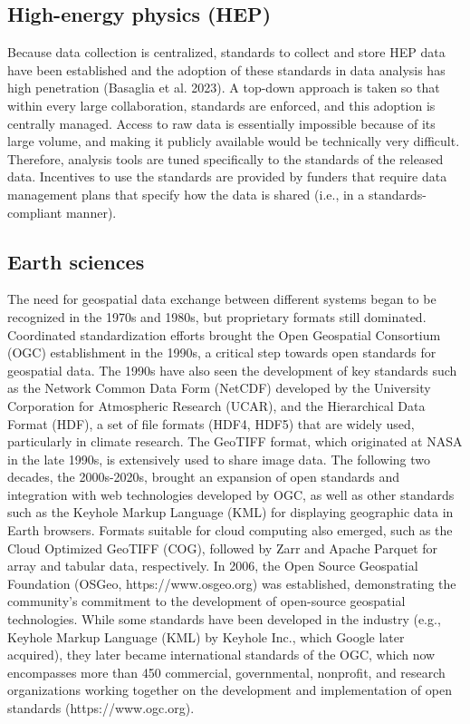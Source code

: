 \documentclass[
  letterpaper,
  DIV=11,
  numbers=noendperiod]{scrartcl}
\begin{document}
\subsection{High-energy physics (HEP)}\label{high-energy-physics-hep}

Because data collection is centralized, standards to collect and store
HEP data have been established and the adoption of these standards in
data analysis has high penetration (Basaglia et al. 2023). A top-down
approach is taken so that within every large collaboration, standards
are enforced, and this adoption is centrally managed. Access to raw data
is essentially impossible because of its large volume, and making it
publicly available would be technically very difficult. Therefore,
analysis tools are tuned specifically to the standards of the released
data. Incentives to use the standards are provided by funders that
require data management plans that specify how the data is shared (i.e.,
in a standards-compliant manner).

\subsection{Earth sciences}\label{earth-sciences}

The need for geospatial data exchange between different systems began to
be recognized in the 1970s and 1980s, but proprietary formats still
dominated. Coordinated standardization efforts brought the Open
Geospatial Consortium (OGC) establishment in the 1990s, a critical step
towards open standards for geospatial data. The 1990s have also seen the
development of key standards such as the Network Common Data Form
(NetCDF) developed by the University Corporation for Atmospheric
Research (UCAR), and the Hierarchical Data Format (HDF), a set of file
formats (HDF4, HDF5) that are widely used, particularly in climate
research. The GeoTIFF format, which originated at NASA in the late
1990s, is extensively used to share image data. The following two
decades, the 2000s-2020s, brought an expansion of open standards and
integration with web technologies developed by OGC, as well as other
standards such as the Keyhole Markup Language (KML) for displaying
geographic data in Earth browsers. Formats suitable for cloud computing
also emerged, such as the Cloud Optimized GeoTIFF (COG), followed by
Zarr and Apache Parquet for array and tabular data, respectively. In
2006, the Open Source Geospatial Foundation (OSGeo,
https://www.osgeo.org) was established, demonstrating the community's
commitment to the development of open-source geospatial technologies.
While some standards have been developed in the industry (e.g., Keyhole
Markup Language (KML) by Keyhole Inc., which Google later acquired),
they later became international standards of the OGC, which now
encompasses more than 450 commercial, governmental, nonprofit, and
research organizations working together on the development and
implementation of open standards (https://www.ogc.org).
\end{document}
